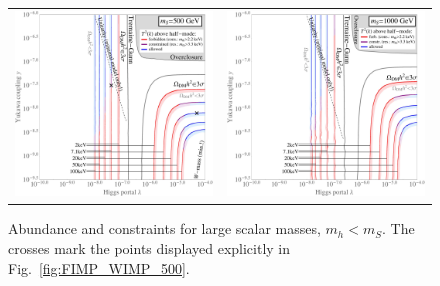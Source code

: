 \begin{figure}[t]
\begin{tabular}{lr}\hspace{-1cm}
 \includegraphics[width=8.3cm]{figures/HalfMode_500_until4.jpeg} & \includegraphics[width=8.3cm]{figures/HalfMode_1000_until4.jpeg}
\end{tabular}
\caption{\label{fig:large_masses}Abundance and constraints for large scalar masses, $m_h < m_S$. The crosses mark the points displayed explicitly in Fig.~\ref{fig:FIMP_WIMP_500}.}
\end{figure}


